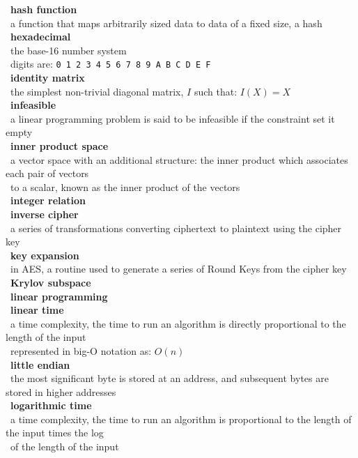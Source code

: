 \documentclass[10pt,letterpaper]{scrartcl}
\newcommand{\tbul}{\textbullet}
\newcommand{\tend}{\>\textendash}
\begin{document}
\begin{tabbing}
\tbul\ \textbf{hash function} \\
    \tend\ a function that maps arbitrarily sized data to data of a fixed size, a hash \\
\tbul\ \textbf{hexadecimal} \\
    \tend\ the base-16 number system \\
    \tend\ digits are: \texttt{0 1 2 3 4 5 6 7 8 9 A B C D E F} \\
\tbul\ \textbf{identity matrix} \\
    \tend\ the simplest non-trivial diagonal matrix, $I$ such that: $I(X)=X$ \\
\tbul\ \textbf{infeasible} \\
    \tend\ a linear programming problem is said to be infeasible if the constraint set it empty \\
\tbul\ \textbf{inner product space} \\
    \tend\ a vector space with an additional structure: the inner product which associates each pair of vectors \\ \>\ to a scalar, known as the inner product of the vectors \\
\tbul\ \textbf{integer relation} \\
\tbul\ \textbf{inverse cipher} \\
    \tend\ a series of transformations converting ciphertext to plaintext using the cipher key \\
\tbul\ \textbf{key expansion} \\
    \tend\ in AES, a routine used to generate a series of Round Keys from the cipher key \\
\tbul\ \textbf{Krylov subspace} \\
\tbul\ \textbf{linear programming} \\ 
\tbul\ \textbf{linear time} \\
    \tend\ a time complexity, the time to run an algorithm is directly proportional to the length of the input \\
    \tend\ represented in big-O notation as: $O(n)$ \\
\tbul\ \textbf{little endian} \\
    \tend\ the most significant byte is stored at an address, and subsequent bytes are stored in higher addresses\\
\tbul\ \textbf{logarithmic time} \\
    \tend\ a time complexity, the time to run an algorithm is proportional to the length of the input times the log \\ \>\ of the length of the input \\

\end{tabbing}
\end{document}
